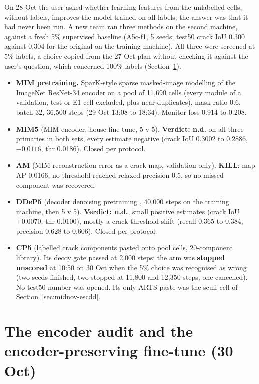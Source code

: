 On 28 Oct the user asked whether learning features from the unlabelled cells, without labels, improves the model trained on all
labels; the answer was that it had never been run. A new team ran three methods on the second machine, against a fresh 5\%
supervised baseline (A5c-f1, 5 seeds; test50 crack IoU 0.300 against 0.304 for the original on the training machine). All three
were screened at 5\% labels, a choice copied from the 27 Oct plan without checking it against the user's question, which concerned
100\% labels (Section~\ref{sec:midnov-erasure}).
\begin{itemize}
  \item \textbf{MIM pretraining.} SparK-style sparse masked-image modelling \citep{tian2023spark} of the ImageNet ResNet-34
    encoder on a pool of 11,690 cells (every module of a validation, test or E1 cell excluded, plus near-duplicates), mask ratio 0.6,
    batch 32, 36,500 steps (29 Oct 13:08 to 18:34). Monitor loss 0.914 to 0.208.
  \item \textbf{MIM5} (MIM encoder, house fine-tune, 5 v 5). \textbf{Verdict: n.d.} on all three primaries in both sets, every
    estimate negative (crack IoU 0.3002 to 0.2886, $-0.0116$, thr 0.0186). Closed per protocol.
  \item \textbf{AM} (MIM reconstruction error as a crack map, validation only). \textbf{KILL}: map AP 0.0166; no threshold reached
    relaxed precision 0.5, so no missed component was recovered.
  \item \textbf{DDeP5} (decoder denoising pretraining \citep{brempong2022ddep}, 40,000 steps on the training machine, then 5 v 5).
    \textbf{Verdict: n.d.}, small positive estimates (crack IoU $+0.0070$, thr 0.0100), mostly a crack threshold shift (recall 0.365
    to 0.384, precision 0.628 to 0.606). Closed per protocol.
  \item \textbf{CP5} (labelled crack components pasted onto pool cells, 20-component library). Its decoy gate passed at 2,000 steps;
    the arm was \textbf{stopped unscored} at 10:50 on 30 Oct when the 5\% choice was recognised as wrong (two seeds finished, two
    stopped at 11,800 and 12,350 steps, one cancelled). No test50 number was opened. Its only ARTS paste was the scuff cell of
    Section~\ref{sec:midnov-escdd}.
\end{itemize}

\section{The encoder audit and the encoder-preserving fine-tune (30 Oct)}\label{sec:midnov-erasure}

